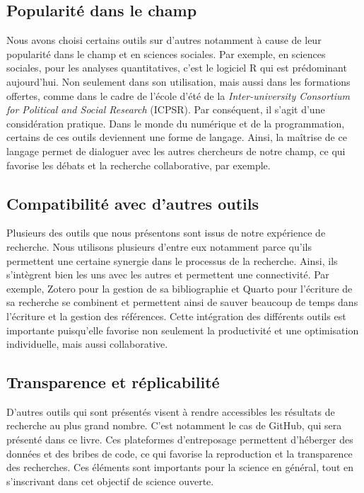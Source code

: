 \documentclass[
  letterpaper,
  DIV=11,
  numbers=noendperiod]{scrreprt}
\begin{document}
\subsection{Popularité dans le champ}\label{popularituxe9-dans-le-champ}

Nous avons choisi certains outils sur d'autres notamment à cause de leur
popularité dans le champ et en sciences sociales. Par exemple, en
sciences sociales, pour les analyses quantitatives, c'est le logiciel R
qui est prédominant aujourd'hui. Non seulement dans son utilisation,
mais aussi dans les formations offertes, comme dans le cadre de l'école
d'été de la \emph{Inter-university Consortium for Political and Social
Research} (ICPSR). Par conséquent, il s'agit d'une considération
pratique. Dans le monde du numérique et de la programmation, certains de
ces outils deviennent une forme de langage. Ainsi, la maîtrise de ce
langage permet de dialoguer avec les autres chercheurs de notre champ,
ce qui favorise les débats et la recherche collaborative, par exemple.

\subsection{Compatibilité avec d'autres
outils}\label{compatibilituxe9-avec-dautres-outils}

Plusieurs des outils que nous présentons sont issus de notre expérience
de recherche. Nous utilisons plusieurs d'entre eux notamment parce
qu'ils permettent une certaine synergie dans le processus de la
recherche. Ainsi, ils s'intègrent bien les uns avec les autres et
permettent une connectivité. Par exemple, Zotero pour la gestion de sa
bibliographie et Quarto pour l'écriture de sa recherche se combinent et
permettent ainsi de sauver beaucoup de temps dans l'écriture et la
gestion des références. Cette intégration des différents outils est
importante puisqu'elle favorise non seulement la productivité et une
optimisation individuelle, mais aussi collaborative.

\subsection{Transparence et
réplicabilité}\label{transparence-et-ruxe9plicabilituxe9}

D'autres outils qui sont présentés visent à rendre accessibles les
résultats de recherche au plus grand nombre. C'est notamment le cas de
GitHub, qui sera présenté dans ce livre. Ces plateformes d'entreposage
permettent d'héberger des données et des bribes de code, ce qui favorise
la reproduction et la transparence des recherches. Ces éléments sont
importants pour la science en général, tout en s'inscrivant dans cet
objectif de science ouverte.
\end{document}
